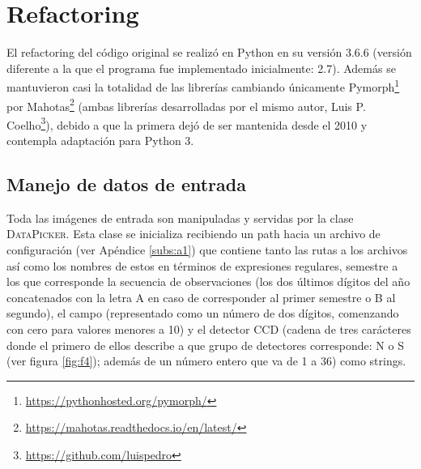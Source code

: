 \chapter{Refactoring}
\label{ch:refactoring}
El refactoring del c\'odigo original se realiz\'o en Python en su versi\'on 3.6.6 (versi\'on diferente a la que el programa fue implementado inicialmente: 2.7). Adem\'as se mantuvieron casi la totalidad de las librer\'ias cambiando \'unicamente Pymorph\footnote{\url{https://pythonhosted.org/pymorph/}} por Mahotas\footnote{\url{https://mahotas.readthedocs.io/en/latest/}} (ambas librer\'ias desarrolladas por el mismo autor, Luis P. Coelho\footnote{\url{https://github.com/luispedro}}), debido a que la primera dej\'o de ser mantenida desde el 2010 y contempla adaptaci\'on para Python 3.   

\section{Manejo de datos de entrada}
Toda las im\'agenes de entrada son manipuladas y servidas por la clase \textsc{DataPicker}. Esta clase se inicializa recibiendo un path hacia un archivo de configuraci\'on (ver Ap\'endice \ref{subs:a1}) que contiene tanto las rutas a los archivos as\'i como los nombres de estos en t\'erminos de expresiones regulares, semestre a los que corresponde la secuencia de observaciones (los dos \'ultimos d\'igitos del a\~no concatenados con la letra A en caso de corresponder al primer semestre o B al segundo), el campo (representado como un n\'umero de dos d\'igitos, comenzando con cero para valores menores a 10) y el detector CCD (cadena de tres car\'acteres donde el primero de ellos describe a que grupo de detectores corresponde: N o S (ver figura \ref{fig:f4}); adem\'as de un n\'umero entero que va de 1 a 36) como strings. 
\bigskip

